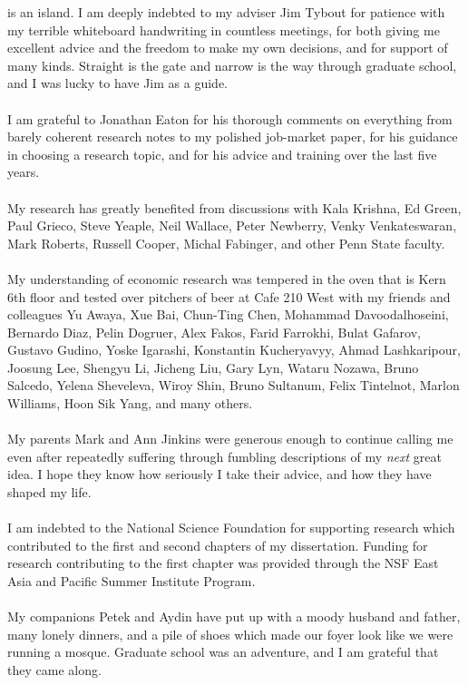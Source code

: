 
 is an island.  I am deeply indebted to my adviser Jim Tybout for patience with my terrible whiteboard handwriting in countless meetings, for both giving me excellent advice and the freedom to make my own decisions, and for support of many kinds.  Straight is the gate and narrow is the way through graduate school, and I was lucky to have Jim as a guide.\\
\vspace{1pt} \\
I am grateful to Jonathan Eaton for his thorough comments on everything from barely coherent research notes to my polished job-market paper, for his guidance in choosing a research topic, and for his advice and training over the last five years.\\
\vspace{1pt}\\
My research has greatly benefited from discussions with Kala Krishna, Ed Green, Paul Grieco, Steve Yeaple, Neil Wallace, Peter Newberry, Venky Venkateswaran, Mark Roberts, Russell Cooper, Michal Fabinger, and other Penn State faculty.\\
\vspace{1pt}\\
My understanding of economic research was tempered in the oven that is Kern 6th floor and tested over pitchers of beer at Cafe 210 West with my friends and colleagues Yu Awaya, Xue Bai, Chun-Ting Chen, Mohammad Davoodalhoseini, Bernardo Diaz, Pelin Dogruer, Alex Fakos, Farid Farrokhi, Bulat Gafarov, Gustavo Gudino, Yoske Igarashi, Konstantin Kucheryavyy, Ahmad Lashkaripour, Joosung Lee, Shengyu Li, Jicheng Liu, Gary Lyn, Wataru Nozawa, Bruno Salcedo, Yelena Sheveleva, Wiroy Shin, Bruno Sultanum, Felix Tintelnot, Marlon Williams, Hoon Sik Yang, and many others.\\
\vspace{1pt}\\
My parents Mark and Ann Jinkins were generous enough to continue calling me even after repeatedly suffering through fumbling descriptions of my \emph{next} great idea.  I hope they know how seriously I take their advice, and how they have shaped my life.\\
\vspace{1pt}\\
I am indebted to the National Science Foundation for supporting research which contributed to the first and second chapters of my dissertation.  Funding for research contributing to the first chapter was provided through the NSF East Asia and Pacific Summer Institute Program.\\
\vspace{1pt}\\
My companions Petek and Aydin have put up with a moody husband and father, many lonely dinners, and a pile of shoes which made our foyer look like we were running a mosque.  Graduate school was an adventure, and I am grateful that they came along.
